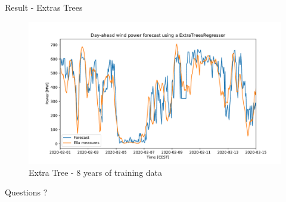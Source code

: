 \documentclass[12pt]{beamer}
\begin{document}
\begin{frame}{Result - Extras Trees}
    \begin{figure}
        \centering
        \includegraphics[width=\textwidth]{resources/pdf/xt_8years.pdf}
        \caption{Extra Tree - 8 years of training data}
    \end{figure}
\end{frame}



\begin{frame}[standout]
  Questions ?
\end{frame}

\begin{frame}[allowframebreaks]
    \printbibliography
\end{frame}
\end{document}
